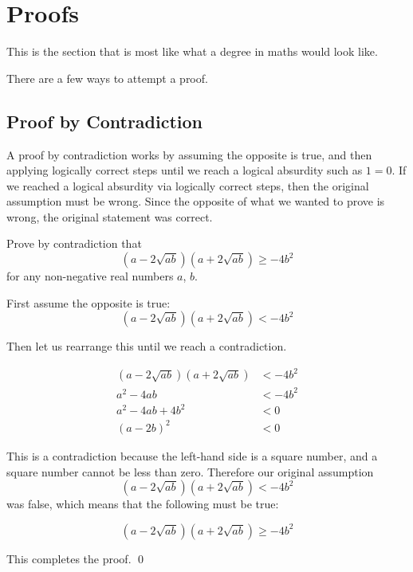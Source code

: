\section{Proofs}\label{sec:proofs}

This is the section that is most like what a degree in maths would look like.

There are a few ways to attempt a proof.

\subsection{Proof by Contradiction} \label{sec:proof-contradiction}
A proof by contradiction works by assuming the opposite is true, and then applying logically correct steps until we reach a logical absurdity such as $1 = 0$. 
If we reached a logical absurdity via logically correct steps, then the original assumption must be wrong. Since the opposite of what we wanted to prove is wrong, 
the original statement was correct.

\begin{example}

    Prove by contradiction that 
    \[ (a - 2\sqrt{ab})(a + 2\sqrt{ab}) \geq - 4b^2\]
    for any non-negative real numbers $a$, $b$.
\end{example}

\begin{solution}
    First assume the opposite is true:
    \[(a - 2\sqrt{ab})(a + 2\sqrt{ab}) < - 4b^2 \]

    Then let us rearrange this until we reach a contradiction.

    \begin{align*}
        (a - 2\sqrt{ab})(a + 2\sqrt{ab}) &< - 4b^2 \\
        a^2 - 4ab &< - 4b^2 \tag{expanding}\\
        a^2 - 4ab + 4b^2  &< 0 \tag{rearranging}\\
        (a - 2b)^2 &< 0 \tag{factorising}
    \end{align*}

    This is a contradiction because the left-hand side is a square number, and a square number cannot be less than zero. Therefore our original assumption
    \[(a - 2\sqrt{ab})(a + 2\sqrt{ab}) < - 4b^2 \]
    was false, which means that the following must be true:

    \[ (a - 2\sqrt{ab})(a + 2\sqrt{ab}) \geq - 4b^2\]

    This completes the proof.
    \qed
\end{solution}


